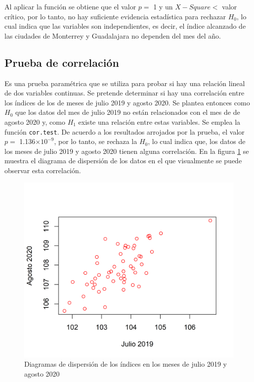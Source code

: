 \documentclass{article}
\begin{document}
Al aplicar la función se obtiene que el valor $p =$ 1 y un $X-Square <$ valor crítico, por lo tanto, no hay suficiente evidencia estadística para rechazar $H_{0}$, lo cual indica que las variables son independientes, es decir, el índice alcanzado de las ciudades de Monterrey y Guadalajara no dependen del mes del año.

   
\subsection{Prueba de correlación}
    
Es una prueba paramétrica que se utiliza para probar si hay una relación lineal de dos variables continuas. Se pretende determinar si hay una correlación entre los índices de los de meses de julio 2019 y agosto 2020. Se plantea entonces como $H_{0}$ que los datos del mes de julio 2019 no están relacionados con el mes de de agosto 2020 y, como $H_{1}$ existe una relación entre estas variables. Se emplea la función \texttt{cor.test}. De acuerdo a los resultados arrojados por la prueba, el valor $p =$ 1.136$\times 10^{-9}$, por lo tanto, se rechaza la $H_{0}$, lo cual indica que, los datos de los meses de julio 2019 y agosto 2020 tienen alguna correlación. En la figura \ref{correlacion} se muestra el diagrama de dispersión de los datos en el que visualmente se puede observar esta correlación.
    

\begin{figure}
\centering
\includegraphics[scale=0.7]{Figures/correlacion.png}
\caption{Diagramas de dispersión de los índices en los meses de julio 2019 y agosto 2020}
\label{correlacion}
\end{figure}
\end{document}
